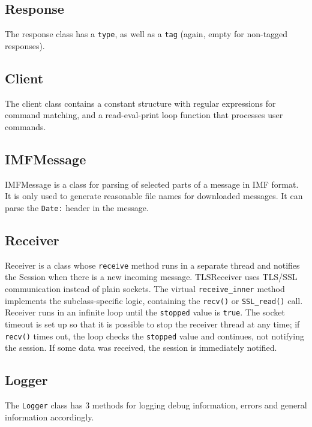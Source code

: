 \documentclass[a4]{report}
\begin{document}
\subsection{Response}

The response class has a \texttt{type}, as well as a \texttt{tag} (again, empty for non-tagged responses).

\subsection{Client}

The client class contains a constant structure with regular expressions for command matching, and a read-eval-print loop function that processes user commands.

\subsection{IMFMessage}

IMFMessage is a class for parsing of selected parts of a message in IMF format\cite{rfc5322}. It is only used to generate reasonable file names for downloaded messages. It can parse the \texttt{Date:} header in the message.

\subsection{Receiver}

Receiver is a class whose \texttt{receive} method runs in a separate thread and notifies the Session when there is a new incoming message. TLSReceiver uses TLS/SSL communication instead of plain sockets. The virtual \texttt{receive\_inner} method implements the subclass-specific logic, containing the \texttt{recv()} or \texttt{SSL\_read()} call. Receiver runs in an infinite loop until the \texttt{stopped} value is \texttt{true}. The socket timeout is set up so that it is possible to stop the receiver thread at any time; if \texttt{recv()} times out, the loop checks the \texttt{stopped} value and continues, not notifying the session. If some data was received, the session is immediately notified.

\subsection{Logger}

The \texttt{Logger} class has 3 methods for logging debug information, errors and general information accordingly.
\end{document}
